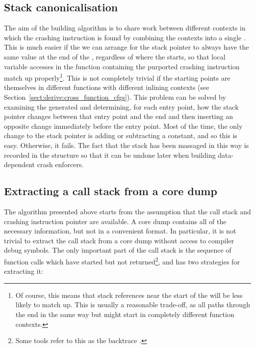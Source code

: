 \subsection{Stack canonicalisation}


The aim of the {\StateMachine} building algorithm is to share work
between different contexts in which the crashing instruction is found
by combining the contexts into a single {\StateMachine}.  This is much
easier if the we can arrange for the stack pointer to always have the
same value at the end of the {\StateMachine}, regardless of where the
{\StateMachine} starts, so that local variable accesses in the
function containing the purported crashing instruction match up
properly\footnote{Of course, this means that stack references near the
  start of the {\StateMachine} will be less likely to match up.  This
  is usually a reasonable trade-off, as all paths through the
  {\StateMachine} end in the same way but might start in completely
  different function contexts.}.  This is not completely trivial if
the starting points are themselves in different functions with
different inlining contexts (see
Section~\ref{sect:derive:cross_function_cfgs}).  This problem can be
solved by examining the generated {\StateMachine} and determining, for
each entry point, how the stack pointer changes between that entry
point and the end and then inserting an opposite change immediately
before the entry point.  Most of the time, the only change to the
stack pointer is adding or subtracting a constant, and so this is
easy.  Otherwise, it fails.  The fact that the stack has been massaged
in this way is recorded in the {\StateMachine} structure so that it
can be undone later when building data-dependent crash enforcers.



\subsection{Extracting a call stack from a core dump}


The algorithm presented above starts from the assumption that the call
stack and crashing instruction pointer are available.  A core dump
contains all of the necessary information, but not in a convenient
format.  In particular, it is not trivial to extract the call stack
from a core dump without access to compiler debug symbols.  The only
important part of the call stack is the sequence of function calls
which have started but not returned\footnote{Some tools refer to this
  as the backtrace .}, and {\technique} has two strategies
for extracting it:

